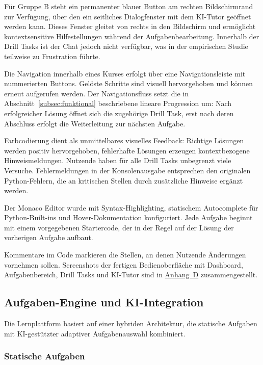 Für Gruppe B steht ein permanenter blauer Button am rechten Bildschirmrand zur Verfügung, über den ein seitliches Dialogfenster mit dem KI-Tutor geöffnet werden kann.
Dieses Fenster gleitet von rechts in den Bildschirm und ermöglicht kontextsensitive Hilfestellungen während der Aufgabenbearbeitung.
Innerhalb der Drill Tasks ist der Chat jedoch nicht verfügbar, was in der empirischen Studie teilweise zu Frustration führte.

Die Navigation innerhalb eines Kurses erfolgt über eine Navigationsleiste mit nummerierten Buttons.
Gelöste Schritte sind visuell hervorgehoben und können erneut aufgerufen werden.
Der Navigationsfluss setzt die in Abschnitt~\ref{subsec:funktional} beschriebene lineare Progression um: Nach erfolgreicher Lösung öffnet sich die zugehörige Drill Task, erst nach deren Abschluss erfolgt die Weiterleitung zur nächsten Aufgabe.

Farbcodierung dient als unmittelbares visuelles Feedback: Richtige Lösungen werden positiv hervorgehoben, fehlerhafte Lösungen erzeugen kontextbezogene Hinweismeldungen.
Nutzende haben für alle Drill Tasks unbegrenzt viele Versuche.
Fehlermeldungen in der Konsolenausgabe entsprechen den originalen Python-Fehlern, die an kritischen Stellen durch zusätzliche Hinweise ergänzt werden.

Der Monaco Editor wurde mit Syntax-Highlighting, statischem Autocomplete für Python-Built-ins und Hover-Dokumentation konfiguriert.
Jede Aufgabe beginnt mit einem vorgegebenen Startercode, der in der Regel auf der Lösung der vorherigen Aufgabe aufbaut.

Kommentare im Code markieren die Stellen, an denen Nutzende Änderungen vornehmen sollen.
Screenshots der fertigen Bedienoberfläche mit Dashboard, Aufgabenbereich, Drill Tasks und KI-Tutor sind in \hyperref[appendix:daten]{Anhang~D} zusammengestellt.


\subsection{Aufgaben-Engine und KI-Integration}\label{subsec:engine}

Die Lernplattform basiert auf einer hybriden Architektur, die statische Aufgaben mit KI-gestützter adaptiver Aufgabenauswahl kombiniert.

\clearpage
\subsubsection{Statische Aufgaben}


